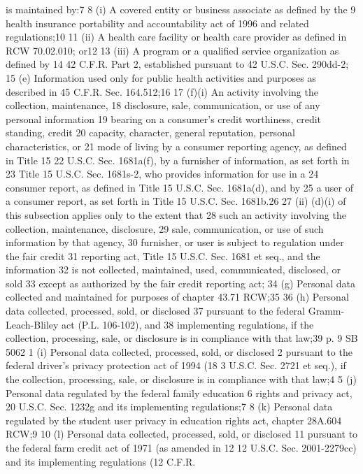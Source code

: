 is maintained by:7
8 (i) A covered entity or business associate as defined by the
9 health insurance portability and accountability act of 1996 and
related regulations;10
11 (ii) A health care facility or health care provider as defined in
RCW 70.02.010; or12
13 (iii) A program or a qualified service organization as defined by
14 42 C.F.R. Part 2, established pursuant to 42 U.S.C. Sec. 290dd-2;
15 (e) Information used only for public health activities and
purposes as described in 45 C.F.R. Sec. 164.512;16
17 (f)(i) An activity involving the collection, maintenance,
18 disclosure, sale, communication, or use of any personal information
19 bearing on a consumer's credit worthiness, credit standing, credit
20 capacity, character, general reputation, personal characteristics, or
21 mode of living by a consumer reporting agency, as defined in Title 15
22 U.S.C. Sec. 1681a(f), by a furnisher of information, as set forth in
23 Title 15 U.S.C. Sec. 1681s-2, who provides information for use in a
24 consumer report, as defined in Title 15 U.S.C. Sec. 1681a(d), and by
25 a user of a consumer report, as set forth in Title 15 U.S.C. Sec.
1681b.26
27 (ii) (d)(i) of this subsection applies only to the extent that
28 such an activity involving the collection, maintenance, disclosure,
29 sale, communication, or use of such information by that agency,
30 furnisher, or user is subject to regulation under the fair credit
31 reporting act, Title 15 U.S.C. Sec. 1681 et seq., and the information
32 is not collected, maintained, used, communicated, disclosed, or sold
33 except as authorized by the fair credit reporting act;
34 (g) Personal data collected and maintained for purposes of
chapter 43.71 RCW;35
36 (h) Personal data collected, processed, sold, or disclosed
37 pursuant to the federal Gramm-Leach-Bliley act (P.L. 106-102), and
38 implementing regulations, if the collection, processing, sale, or
disclosure is in compliance with that law;39
p. 9 SB 5062
1 (i) Personal data collected, processed, sold, or disclosed
2 pursuant to the federal driver's privacy protection act of 1994 (18
3 U.S.C. Sec. 2721 et seq.), if the collection, processing, sale, or
disclosure is in compliance with that law;4
5 (j) Personal data regulated by the federal family education
6 rights and privacy act, 20 U.S.C. Sec. 1232g and its implementing
regulations;7
8 (k) Personal data regulated by the student user privacy in
education rights act, chapter 28A.604 RCW;9
10 (l) Personal data collected, processed, sold, or disclosed
11 pursuant to the federal farm credit act of 1971 (as amended in 12
12 U.S.C. Sec. 2001-2279cc) and its implementing regulations (12 C.F.R.
